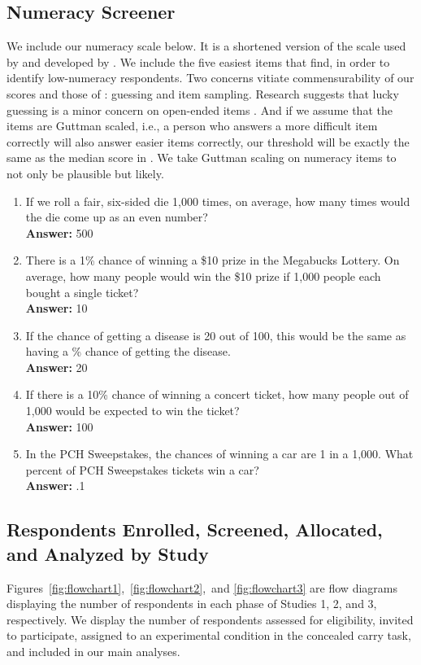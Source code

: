 \documentclass[12pt, letterpaper]{article}
\begin{document}
\bigskip
\subsection{Numeracy Screener}
\label{sec:numscreener}
\doublespacing
\setlength{\parindent}{1cm} 

We include our numeracy scale below. It is a shortened version of the scale used by \citet{kahan2017} and developed by \citet{weller2012}. We include the five easiest items that \citeauthor{weller2012} find, in order to identify low-numeracy respondents. Two concerns vitiate commensurability of our scores and those of \citeauthor{kahan2017}: guessing and item sampling. Research suggests that lucky guessing is a minor concern on open-ended items \citep{luskin2011}. And if we assume that the items are Guttman scaled, i.e., a person who answers a more difficult item correctly will also answer easier items correctly, our threshold will be exactly the same as the median score in \citeauthor{kahan2017}. We take Guttman scaling on numeracy items to not only be plausible but likely.

\begin{enumerate}
  \item If we roll a fair, six-sided die 1,000 times, on average, how many times would the die come up as an even number? \\{\bf Answer:} 500
  \item There is a 1\% chance of winning a \$10 prize in the Megabucks Lottery. On average, how many people would win the \$10 prize if 1,000 people each bought a single ticket? \\{\bf Answer:} 10
  \item If the chance of getting a disease is 20 out of 100, this would be the same as having a \underline{\hspace{1cm}}\% chance of getting the disease. \\{\bf Answer:} 20
  \item If there is a 10\% chance of winning a concert ticket, how many people out of 1,000 would be expected to win the ticket? \\{\bf Answer:} 100
  \item In the PCH Sweepstakes, the chances of winning a car are 1 in a 1,000. What percent of PCH Sweepstakes tickets win a car? \\{\bf Answer:} .1
\end{enumerate}

\newpage
\subsection{Respondents Enrolled, Screened, Allocated, and Analyzed by Study}
\label{sec:flow}
Figures~\ref{fig:flowchart1},~\ref{fig:flowchart2},~and \ref{fig:flowchart3} are flow diagrams displaying the number of respondents in each phase of Studies 1, 2, and 3, respectively. We display the number of respondents assessed for eligibility, invited to participate, assigned to an experimental condition in the concealed carry task, and included in our main analyses.
\end{document}
